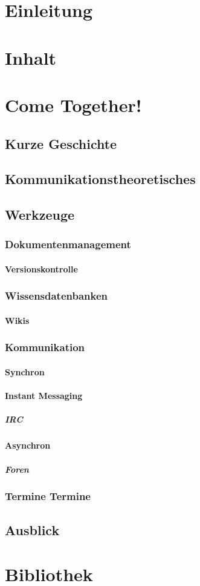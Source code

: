 \documentclass[a4paper,10pt]{book}
\begin{document}
\part{Einleitung}
\part{Inhalt}
\tableofcontents
\part{Come Together!}
\chapter{Kurze Geschichte}
\chapter{Kommunikationstheoretisches}
\chapter{Werkzeuge}
\section{Dokumentenmanagement}
\subsection{Versionskontrolle}
\section{Wissensdatenbanken}
\subsection{Wikis}
\section{Kommunikation}
\subsection{Synchron}
\subsection{Instant Messaging}
\subsubsection{IRC}
\subsection{Asynchron}
\subsubsection{Foren}
\section{Termine Termine}
\chapter{Ausblick}
\part{Bibliothek}
\end{document}
